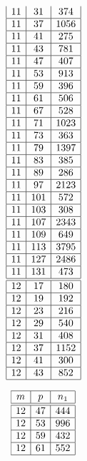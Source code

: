 \documentclass[a4paper, 10pt]{article}
\begin{document}
\begin{center}
\begin{minipage}[t]{.23\textwidth}
\begin{displaymath}
\begin{array}{|c|c|c|}
11 & 31 & 374 \\ \hline
11 & 37 & 1056 \\ \hline
11 & 41 & 275 \\ \hline
11 & 43 & 781 \\ \hline
11 & 47 & 407 \\ \hline
11 & 53 & 913 \\ \hline
11 & 59 & 396 \\ \hline
11 & 61 & 506 \\ \hline
11 & 67 & 528 \\ \hline
11 & 71 & 1023 \\ \hline
11 & 73 & 363 \\ \hline
11 & 79 & 1397 \\ \hline
11 & 83 & 385 \\ \hline
11 & 89 & 286 \\ \hline
11 & 97 & 2123 \\ \hline
11 & 101 & 572 \\ \hline
11 & 103 & 308 \\ \hline
11 & 107 & 2343 \\ \hline
11 & 109 & 649 \\ \hline
11 & 113 & 3795 \\ \hline
11 & 127 & 2486 \\ \hline
11 & 131 & 473 \\ \hline
\hline
12 & 17 & 180 \\ \hline
12 & 19 & 192 \\ \hline
12 & 23 & 216 \\ \hline
12 & 29 & 540 \\ \hline
12 & 31 & 408 \\ \hline
12 & 37 & 1152 \\ \hline
12 & 41 & 300 \\ \hline
12 & 43 & 852 \\ \hline
\end{array}
\end{displaymath}
\end{minipage}
\begin{minipage}[t]{.23\textwidth}
\begin{displaymath}
\begin{array}{|c|c|c|}
\hline
m & p & n_{1} \\ \hline
\hline
12 & 47 & 444 \\ \hline
12 & 53 & 996 \\ \hline
12 & 59 & 432 \\ \hline
12 & 61 & 552 \\ \hline

\end{array}
\end{displaymath}
\end{minipage}
\end{center}
\end{document}
